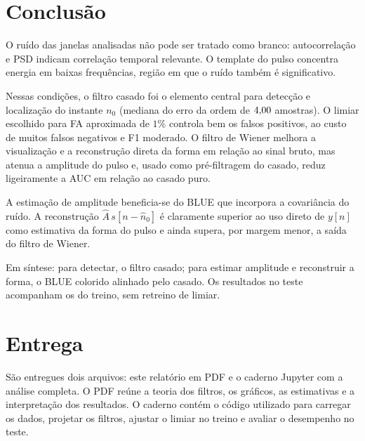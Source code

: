 \section{Conclusão}

O ruído das janelas analisadas não pode ser tratado como branco: autocorrelação
e PSD indicam correlação temporal relevante. O template do pulso concentra
energia em baixas frequências, região em que o ruído também é significativo.

Nessas condições, o filtro casado foi o elemento central para detecção e
localização do instante \(n_0\) (mediana do erro da ordem de
\(4{,}00\) amostras). O limiar escolhido para FA aproximada de \(1\%\)
controla bem os falsos positivos, ao custo de muitos falsos negativos e F1
moderado. O filtro de Wiener melhora a visualização e a reconstrução direta da
forma em relação ao sinal bruto, mas atenua a amplitude do pulso e, usado como
pré-filtragem do casado, reduz ligeiramente a AUC em relação ao casado puro.

A estimação de amplitude beneficia-se do BLUE que incorpora a covariância do
ruído. A reconstrução \(\hat{A}\,s[n-\hat{n}_0]\) é claramente superior ao uso
direto de \(y[n]\) como estimativa da forma do pulso e ainda supera, por
margem menor, a saída do filtro de Wiener.

Em síntese: para detectar, o filtro casado; para estimar amplitude e
reconstruir a forma, o BLUE colorido alinhado pelo casado. Os resultados no
teste acompanham os do treino, sem retreino de limiar.

\section*{Entrega}

São entregues dois arquivos: este relatório em PDF e o caderno Jupyter com a
análise completa. O PDF reúne a teoria dos filtros, os gráficos, as estimativas
e a interpretação dos resultados. O caderno contém o código utilizado para
carregar os dados, projetar os filtros, ajustar o limiar no treino e avaliar o
desempenho no teste.
